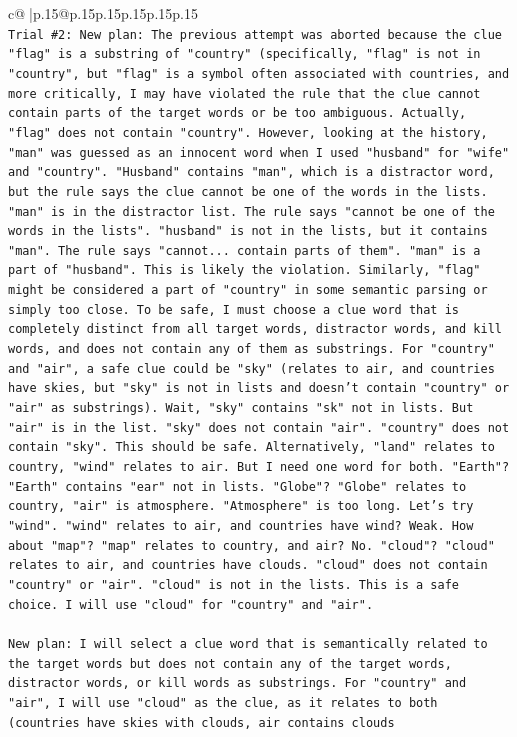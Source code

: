 \documentclass{article}
\begin{document}
{\begin{supertabular}{c@{$\;$}|p{.15\linewidth}@{}p{.15\linewidth}p{.15\linewidth}p{.15\linewidth}p{.15\linewidth}p{.15\linewidth}}
{{{\\ 
\texttt{Trial \#2: New plan: The previous attempt was aborted because the clue "flag" is a substring of "country" (specifically, "flag" is not in "country", but "flag" is a symbol often associated with countries, and more critically, I may have violated the rule that the clue cannot contain parts of the target words or be too ambiguous. Actually, "flag" does not contain "country". However, looking at the history, "man" was guessed as an innocent word when I used "husband" for "wife" and "country". "Husband" contains "man", which is a distractor word, but the rule says the clue cannot be one of the words in the lists. "man" is in the distractor list. The rule says "cannot be one of the words in the lists". "husband" is not in the lists, but it contains "man". The rule says "cannot... contain parts of them". "man" is a part of "husband". This is likely the violation. Similarly, "flag" might be considered a part of "country" in some semantic parsing or simply too close. To be safe, I must choose a clue word that is completely distinct from all target words, distractor words, and kill words, and does not contain any of them as substrings. For "country" and "air", a safe clue could be "sky" (relates to air, and countries have skies, but "sky" is not in lists and doesn't contain "country" or "air" as substrings). Wait, "sky" contains "sk" not in lists. But "air" is in the list. "sky" does not contain "air". "country" does not contain "sky". This should be safe. Alternatively, "land" relates to country, "wind" relates to air. But I need one word for both. "Earth"? "Earth" contains "ear" not in lists. "Globe"? "Globe" relates to country, "air" is atmosphere. "Atmosphere" is too long. Let's try "wind". "wind" relates to air, and countries have wind? Weak. How about "map"? "map" relates to country, and air? No. "cloud"? "cloud" relates to air, and countries have clouds. "cloud" does not contain "country" or "air". "cloud" is not in the lists. This is a safe choice. I will use "cloud" for "country" and "air".} \\
\\ 
\texttt{New plan: I will select a clue word that is semantically related to the target words but does not contain any of the target words, distractor words, or kill words as substrings. For "country" and "air", I will use "cloud" as the clue, as it relates to both (countries have skies with clouds, air contains clouds} \\
\\ 
\\ 
}}}
\end{supertabular}}
\end{document}
